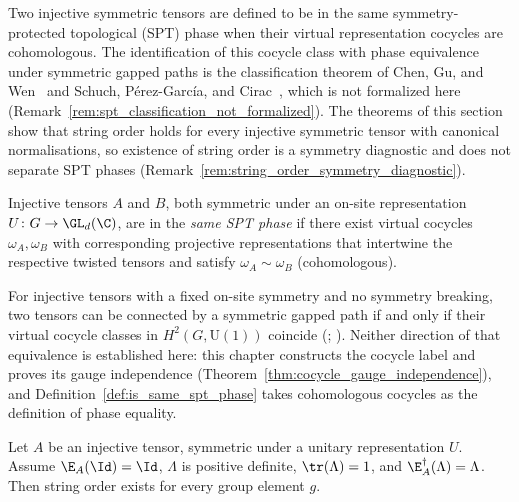 Two injective symmetric tensors are defined to be in the same
symmetry-protected topological (SPT) phase when their virtual
representation cocycles are cohomologous. The identification of this
cocycle class with phase equivalence under symmetric gapped paths is the
classification theorem of Chen, Gu, and Wen~\cite{ChenGuWen2011} and
Schuch, P\'erez-Garc\'ia, and Cirac~\cite[Section~II.F]{Schuch2011Phases},
which is not formalized here
(Remark~\ref{rem:spt_classification_not_formalized}). The theorems of
this section show that string order holds for every injective symmetric
tensor with canonical normalisations, so existence of string order is a
symmetry diagnostic and does not separate SPT phases
(Remark~\ref{rem:string_order_symmetry_diagnostic}).

\begin{definition}\label{def:is_same_spt_phase}
    \leanok
    Injective tensors $A$ and $B$, both symmetric under an on-site
    representation $U \colon G \to \GL_{d}(\C)$, are in the \emph{same SPT
        phase} if there exist virtual cocycles $\omega_A,\omega_B$ with
    corresponding projective representations that intertwine the
    respective twisted tensors and satisfy
    $\omega_A\sim\omega_B$ (cohomologous).
\end{definition}

\begin{remark}%
    \label{rem:spt_classification_not_formalized}
    For injective tensors with a fixed on-site symmetry and no symmetry
    breaking, two tensors can be connected by a symmetric gapped path if
    and only if their virtual cocycle classes in $H^2(G,\mathrm{U}(1))$
    coincide (\cite{ChenGuWen2011};
    \cite[Section~II.F]{Schuch2011Phases}). Neither direction of that
    equivalence is established here: this chapter constructs the cocycle
    label and proves its gauge independence
    (Theorem~\ref{thm:cocycle_gauge_independence}), and
    Definition~\ref{def:is_same_spt_phase} takes cohomologous cocycles as
    the definition of phase equality.
\end{remark}

\begin{theorem}%
    \label{thm:has_string_order_of_symmetric_injective}
    \leanok
    Let $A$ be an injective tensor, symmetric under a unitary
    representation $U$. Assume $\E_A(\Id)=\Id$, $\Lambda$ is positive
    definite, $\tr(\Lambda)=1$, and $\E_A^\dagger(\Lambda)=\Lambda$.
    Then string order exists for every group element $g$.
\end{theorem}

